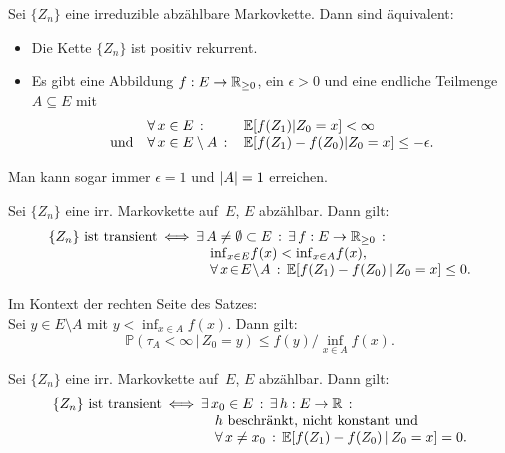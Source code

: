 \documentclass{cheat-sheet}
\renewcommand{\P}{\mathbb{P}} %
\newcommand{\E}{\mathbb{E}} %
\begin{document}
\begin{satz}
  Sei $\{ Z_n \}$ eine irreduzible abzählbare Markovkette.
  Dann sind äquivalent:
  \begin{itemize}
    \item Die Kette $\{ Z_n \}$ ist positiv rekurrent.
    \item Es gibt eine Abbildung $f : E \to \mathbb{R}_{\geq 0}$, ein $\epsilon > 0$ und eine endliche Teilmenge $A \subseteq E$ mit
    \[
      \begin{array}{r l l}
        & \fa{x \in E} & \E[ f(Z_1) | Z_0 = x ] < \infty \\
        \text{und} & \fa{x \in E \setminus A} & \E[ f(Z_1) - f(Z_0) | Z_0 = x ] \leq - \epsilon.
      \end{array}
    \]
  \end{itemize}
\end{satz}

\begin{bem}
  Man kann sogar immer $\epsilon = 1$ und $\lvert A\rvert = 1$ erreichen.
\end{bem}


\begin{satz}
  Sei $\{ Z_n \}$ eine irr. Markovkette auf~$E$, $E$ abzählbar.
  Dann gilt:
  \[
    \arraycolsep=1pt
    \begin{array}{r c l}
      \{ Z_n \} \text{ ist transient}
      &\iff&
      \ex{A \neq \emptyset \subset E} \ex{f : E \to \R_{\geq 0}} \\
      && \quad {\inf}_{x \in E} f(x) < {\inf}_{x \in A} f(x), \\
      && \quad \fa{x \!\in\! E \!\setminus\! A} \E[ f(Z_1) - f(Z_0) \,|\, Z_0 = x ] \leq 0.
    \end{array}
  \]
\end{satz}

\begin{lem}
  \begin{minipage}[t]{0.8 \linewidth}
    Im Kontext der rechten Seite des Satzes: \\
    Sei $y \in E \setminus A$ mit $y < {\inf}_{x \in A} f(x)$.
    Dann gilt:
    \[
      \P(\tau_A < \infty \,|\, Z_0 = y) \leq f(y) / {\inf}_{x \in A} f(x).
    \]
  \end{minipage}
\end{lem}

\begin{kor}
  Sei $\{ Z_n \}$ eine irr. Markovkette auf~$E$, $E$ abzählbar.
  Dann gilt:
  \[
    \arraycolsep=1pt
    \begin{array}{r c l}
      \{ Z_n \} \text{ ist transient}
      &\iff&
      \ex{x_0 \in E} \ex{h : E \to \R} \\
      && \quad \text{$h$ beschränkt, nicht konstant und} \\
      && \quad \fa{x \neq x_0} \E[ f(Z_1) - f(Z_0) \,|\, Z_0 = x ] = 0.
    \end{array}
  \]
\end{kor}
\end{document}
